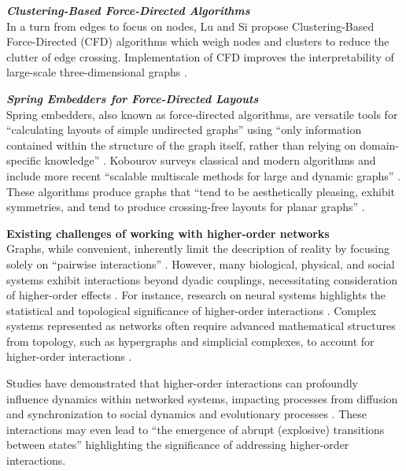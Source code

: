 \noindent \textbf{\textit{Clustering-Based Force-Directed Algorithms}} \\
In a turn from edges to focus on nodes, Lu and Si propose Clustering-Based Force-Directed (CFD) algorithms which weigh nodes and clusters to reduce the clutter of edge crossing. Implementation of CFD improves the interpretability of large-scale three-dimensional graphs \citep[p. 2]{lu_clustering-based_2020}.

\noindent \textbf{\textit{Spring Embedders for Force-Directed Layouts}} \\
Spring embedders, also known as force-directed algorithms, are versatile tools for “calculating layouts of simple undirected graphs” using “only information contained within the structure of the graph itself, rather than relying on domain-specific knowledge” \citep[p. 1]{kobourov_spring_2012}. Kobourov surveys classical and modern algorithms and include more recent “scalable multiscale methods for large and dynamic graphs” \citep[p. 1]{kobourov_spring_2012}. These algorithms produce graphs that “tend to be aesthetically pleasing, exhibit symmetries, and tend to produce crossing-free layouts for planar graphs” \citep[p. 1]{kobourov_spring_2012}.

\noindent \textbf{Existing challenges of working with higher-order networks}
\\
Graphs, while convenient, inherently limit the description of reality by focusing solely on “pairwise interactions”  \citep[p. 1]{battiston_physics_2021}. However, many biological, physical, and social systems exhibit interactions beyond dyadic couplings, necessitating consideration of higher-order effects \citep[p. 1]{battiston_physics_2021}. For instance, research on neural systems highlights the statistical and topological significance of higher-order interactions \citep[p. 1]{battiston_physics_2021}. Complex systems represented as networks often require advanced mathematical structures from topology, such as hypergraphs and simplicial complexes, to account for higher-order interactions \citep[p. 2]{battiston_physics_2021}.

Studies have demonstrated that higher-order interactions can profoundly influence dynamics within networked systems, impacting processes from diffusion and synchronization to social dynamics and evolutionary processes \citep[p. 2]{battiston_physics_2021}. These interactions may even lead to “the emergence of abrupt (explosive) transitions between states” \citep[p. 2]{battiston_physics_2021} highlighting the significance of addressing higher-order interactions.

